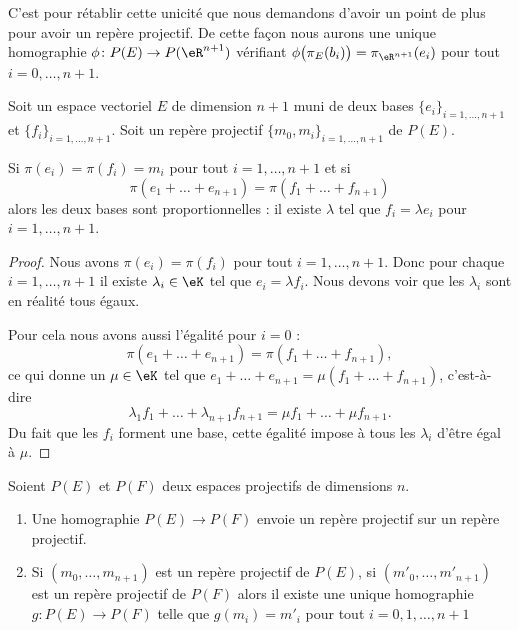 C'est pour rétablir cette unicité que nous demandons d'avoir un point de plus pour avoir un repère projectif. De cette façon nous aurons une unique homographie \( \phi\colon P(E)\to P(\eR^{n+1})\) vérifiant \( \phi\big( \pi_E(b_i) \big)=\pi_{\eR^{n+1}}(e_i)\) pour tout \( i=0,\ldots, n+1\).

\begin{lemma}
	Soit un espace vectoriel \( E\) de dimension \( n+1\) muni de deux bases \( \{ e_i \}_{i=1,\ldots, n+1}\) et \( \{ f_i \}_{i=1,\ldots, n+1}\). Soit un repère projectif \( \{ m_0,m_i \}_{i=1,\ldots, n+1}  \) de \( P(E)\).

	Si \( \pi(e_i)=\pi(f_i)=m_i\) pour tout \( i=1,\ldots, n+1\) et si
	\begin{equation}
		\pi(e_1+\ldots +e_{n+1})=\pi(f_1+\ldots +f_{n+1})
	\end{equation}
	alors les deux bases sont proportionnelles : il existe \( \lambda\) tel que \( f_i=\lambda e_i\) pour \( i=1,\ldots, n+1\).
\end{lemma}

\begin{proof}
	Nous avons \( \pi(e_i)=\pi(f_i)\) pour tout \( i=1,\ldots, n+1\). Donc pour chaque \( i=1,\ldots, n+1\) il existe \( \lambda_i\in \eK\) tel que \( e_i=\lambda f_i\). Nous devons voir que les \( \lambda_i\) sont en réalité tous égaux.

	Pour cela nous avons aussi l'égalité pour \( i=0\) :
	\begin{equation}
		\pi(e_1+\ldots +e_{n+1})=\pi(f_1+\ldots +f_{n+1}),
	\end{equation}
	ce qui donne un \( \mu\in \eK\) tel que \( e_1+\ldots +e_{n+1}=\mu(f_1+\ldots +f_{n+1})\), c'est-à-dire
	\begin{equation}
		\lambda_1 f_1+\ldots +\lambda_{n+1}f_{n+1}=\mu f_1+\ldots +\mu f_{n+1}.
	\end{equation}
	Du fait que les \( f_i\) forment une base, cette égalité impose à tous les \( \lambda_i\) d'être égal à \( \mu\).
\end{proof}

\begin{theorem}     \label{THOooTXPVooJGigne}
	Soient \( P(E)\) et \( P(F)\) deux espaces projectifs de dimensions \( n\).
	\begin{enumerate}
		\item       \label{ITEMooRSIWooXbEnlT}
		      Une homographie \( P(E)\to P(F)\) envoie un repère projectif sur un repère projectif.
		\item       \label{ITEMooQXQXooDyIsxsh}
		      Si \( (m_0,\ldots, m_{n+1})\) est un repère projectif de \( P(E)\), si \( (m'_0,\ldots, m'_{n+1})\) est un repère projectif de \( P(F)\) alors il existe une unique homographie \( g\colon P(E)\to P(F)\) telle que \( g(m_i)=m'_i\) pour tout \( i=0,1,\ldots, n+1\)
	\end{enumerate}
\end{theorem}

